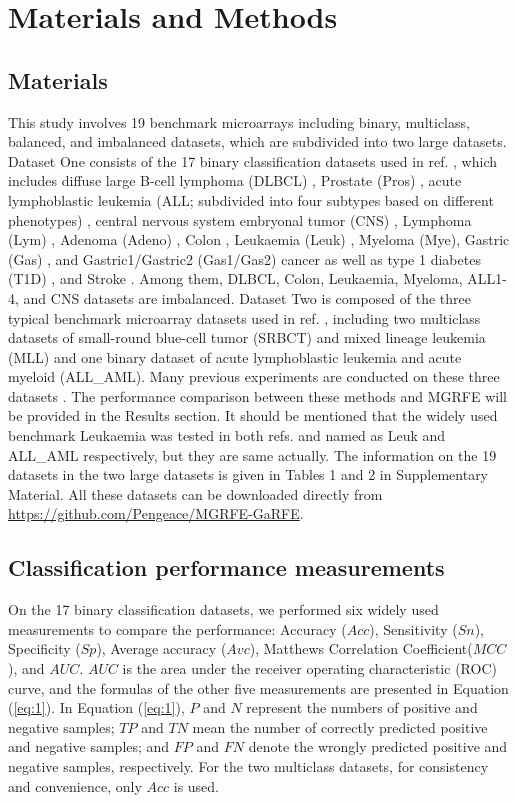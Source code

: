\documentclass[10pt,journal,compsoc]{IEEEtran}
\begin{document}
	\section{Materials and Methods}
	\subsection{Materials}
	
	This study involves 19 benchmark microarrays including binary, multiclass, balanced, and imbalanced datasets, which are subdivided into two large datasets.
	Dataset One consists of the 17 binary classification datasets used in ref. \cite{W16}, which includes diffuse large B-cell lymphoma (DLBCL) \cite{Y22}, Prostate (Pros) \cite{Y23}, acute lymphoblastic leukemia (ALL; subdivided into four subtypes based on different phenotypes) \cite{Y24}, central nervous system embryonal tumor (CNS) \cite{Y25}, Lymphoma (Lym) \cite{Y26}, Adenoma (Adeno) \cite{Y27}, Colon \cite{Y20}, Leukaemia (Leuk) \cite{Y21}, Myeloma (Mye)\cite{Y28}, Gastric (Gas) \cite{Y29}, and Gastric1/Gastric2 (Gas1/Gas2) cancer \cite{Y30} as well as type 1 diabetes (T1D) \cite{Y31}, and Stroke \cite{Y32}. Among them, DLBCL, Colon, Leukaemia, Myeloma, ALL1-4, and CNS datasets are imbalanced.
	Dataset Two is composed of the three typical benchmark microarray datasets used in ref. \cite{W15}, including two multiclass datasets of small-round blue-cell tumor (SRBCT) \cite{P13} and mixed lineage leukemia (MLL) \cite{W3} and one binary dataset of acute lymphoblastic leukemia and acute myeloid (ALL\_AML). Many previous experiments are conducted on these three datasets \cite{P8,P9,P10,P11,P12,P13,P14,P15,P16,P17,P18,P19,P20,P21,P22,P23}. The performance comparison between these methods and MGRFE will be provided in the Results section. It should be mentioned that the widely used benchmark Leukaemia was tested in both refs. \cite{W16} and \cite{W15} named as Leuk and ALL\_AML respectively, but they are same actually.
	The information on the 19 datasets in the two large datasets is given in Tables 1 and 2 in Supplementary Material. All these datasets can be downloaded directly from \url{https://github.com/Pengeace/MGRFE-GaRFE}.
	
	\subsection{Classification performance measurements}
	
	On the 17 binary classification datasets, we performed six widely used measurements to compare the performance: Accuracy ($Acc$), Sensitivity ($Sn$), Specificity ($Sp$), Average accuracy ($Avc$), Matthews Correlation Coefficient($MCC$), and $AUC$. $AUC$ is the area under the receiver operating characteristic (ROC) curve, and the formulas of the other five measurements are presented in Equation (\ref{eq:1}). In Equation (\ref{eq:1}), $P$ and $N$ represent the numbers of positive and negative samples; $TP$ and $TN$ mean the number of correctly predicted positive and negative samples; and $FP$ and $FN$ denote the wrongly predicted positive and negative samples, respectively. For the two multiclass datasets, for consistency and convenience, only \(Acc\) is used.
	
\end{document}
